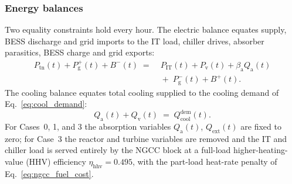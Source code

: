 \documentclass[a4paper,fleqn]{cas-sc}
\begin{document}
\subsubsection{Energy balances}
Two equality constraints hold every hour. The electric balance equates supply, BESS discharge and grid imports to the IT load, chiller drives, absorber parasitics, BESS charge and grid exports:
\begin{equation}
\begin{aligned}
P_\mathrm{tn}(t) + P_\mathrm{g}^{+}(t) + B^{-}(t) \;=\;{}
& P_\mathrm{IT}(t) + P_\mathrm{v}(t) + \beta_\mathrm{a} Q_\mathrm{a}(t) \\
& {}+\; P_\mathrm{g}^{-}(t) + B^{+}(t).
\end{aligned}
\end{equation}
The cooling balance equates total cooling supplied to the cooling demand of Eq.~\eqref{eq:cool_demand}:
\begin{equation}
\label{eq:cool_balance}
Q_\mathrm{a}(t) + Q_\mathrm{v}(t) \;=\; Q_\mathrm{cool}^\mathrm{dem}(t).
\end{equation}
For Cases~0, 1, and 3 the absorption variables $Q_\mathrm{a}(t)$, $Q_\mathrm{ext}(t)$ are fixed to zero; for Case~3 the reactor and turbine variables are removed and the IT and chiller load is served entirely by the NGCC block at a full-load higher-heating-value (HHV) efficiency $\eta_\mathrm{hhv}=0.495$, with the part-load heat-rate penalty of Eq.~\eqref{eq:ngcc_fuel_cost}.
\end{document}
